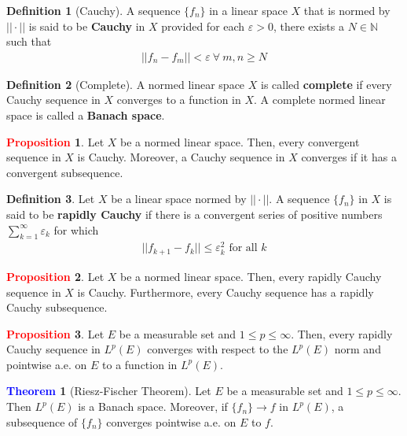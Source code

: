 \documentclass[11pt]{article}
\theoremstyle{definition}
\theoremstyle{definition}
\newcommand{\bb}[1]{\mathbb{#1}}
\newtheorem{theorem}{\textcolor{blue}{Theorem}}
\theoremstyle{definition}
\newtheorem{definition}{\textcolor{OliveGreen}{Definition}}
\newtheorem{prop}{\textcolor{red}{Proposition}}
\theoremstyle{remark}
\begin{document}
\begin{definition}[Cauchy]
	A sequence $\{ f_n \}$ in a linear space $X$ that is normed by $|| \cdot ||$ is said to be \textbf{Cauchy} in $X$ provided for each $\varepsilon > 0$, there exists a $N \in \bb{N}$ such that 
	\begin{align}
		|| f_n - f_m || < \varepsilon\ \forall\ m, n \geq N
	\end{align}
\end{definition}

\begin{definition}[Complete]
	A normed linear space $X$ is called \textbf{complete} if every Cauchy sequence in $X$ converges to a function in $X$. A complete normed linear space is called a \textbf{Banach space}. 
\end{definition}


\begin{prop}
	Let $X$ be a normed linear space. Then, every convergent sequence in $X$ is Cauchy. Moreover, a Cauchy sequence in $X$ converges if it has a convergent subsequence. 
\end{prop}

\begin{definition}
	Let $X$ be a linear space normed by $|| \cdot ||$. A sequence $\{ f_n \}$ in $X$ is said to be \textbf{rapidly Cauchy} if there is a convergent series of positive numbers $\sum_{k=1}^\infty \varepsilon_k$ for which 
	\begin{align*}
		|| f_{k+1} - f_k || \leq \varepsilon_k^2 	\text{ for all $k$} 
	\end{align*}
	
\end{definition}

\begin{prop}
	Let $X$ be a normed linear space. Then, every rapidly Cauchy sequence in $X$ is Cauchy. Furthermore, every Cauchy sequence has a rapidly Cauchy subsequence. 
\end{prop}

\begin{prop}
	Let $E$ be a measurable set and $1 \leq p \leq \infty$. Then, every rapidly Cauchy sequence in $L^p(E)$ converges with respect to the $L^p(E)$ norm and pointwise a.e. on $E$ to a function in $L^p(E)$. 
\end{prop}

\begin{theorem}[Riesz-Fischer Theorem] 
	Let $E$ be a measurable set and $1 \leq p \leq \infty$. Then $L^p(E)$ is a Banach space. Moreover, if $\{f_n \} \rightarrow f$ in $L^p(E)$, a subsequence of $\{ f_n \}$ converges pointwise a.e. on $E$ to $f$. 
\end{theorem}
\end{document}
